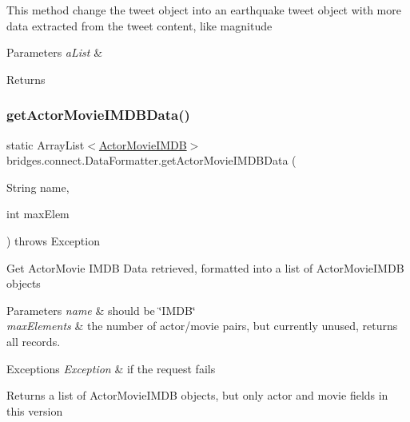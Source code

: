 This method change the tweet object into an earthquake tweet object with more data extracted from the tweet content, like magnitude 
\begin{DoxyParams}{Parameters}
{\em a\+List} & \\
\hline
\end{DoxyParams}
\begin{DoxyReturn}{Returns}

\end{DoxyReturn}
\hypertarget{classbridges_1_1connect_1_1_data_formatter_a403ece4f61c11b75a0318ea565669165}{}\label{classbridges_1_1connect_1_1_data_formatter_a403ece4f61c11b75a0318ea565669165} 
\subsubsection{\texorpdfstring{get\+Actor\+Movie\+I\+M\+D\+B\+Data()}{getActorMovieIMDBData()}}
{\footnotesize\ttfamily static Array\+List$<$\hyperlink{classbridges_1_1data__src__dependent_1_1_actor_movie_i_m_d_b}{Actor\+Movie\+I\+M\+DB}$>$ bridges.\+connect.\+Data\+Formatter.\+get\+Actor\+Movie\+I\+M\+D\+B\+Data (\begin{DoxyParamCaption}\item[{String}]{name,  }\item[{int}]{max\+Elem }\end{DoxyParamCaption}) throws Exception\hspace{0.3cm}{\ttfamily [static]}}

Get Actor\+Movie I\+M\+DB Data retrieved, formatted into a list of Actor\+Movie\+I\+M\+DB objects


\begin{DoxyParams}{Parameters}
{\em name} & should be \char`\"{}\+I\+M\+D\+B\char`\"{} \\
\hline
{\em max\+Elements} & the number of actor/movie pairs, but currently unused, returns all records. \\
\hline
\end{DoxyParams}

\begin{DoxyExceptions}{Exceptions}
{\em Exception} & if the request fails\\
\hline
\end{DoxyExceptions}
\begin{DoxyReturn}{Returns}
a list of Actor\+Movie\+I\+M\+DB objects, but only actor and movie fields in this version 
\end{DoxyReturn}
\hypertarget{classbridges_1_1connect_1_1_data_formatter_a9b599616c4d7a502f9fab8663173db6d}{}\label{classbridges_1_1connect_1_1_data_formatter_a9b599616c4d7a502f9fab8663173db6d} 
